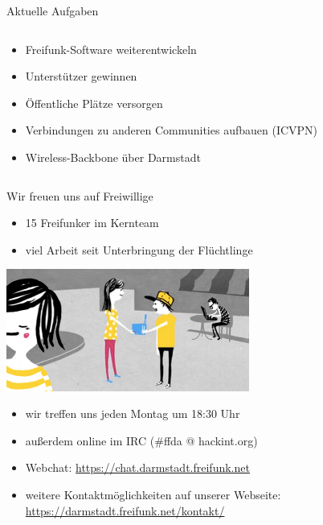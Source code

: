 \documentclass[10pt]{beamer}
\begin{document}
\begin{frame}{Aktuelle Aufgaben}
\begin{columns}[T]
\begin{column}{7cm}
\begin{itemize}
        \end{itemize}
        \begin{itemize}
          \item Freifunk-Software weiterentwickeln
          \item Unterstützer gewinnen
          \item Öffentliche Plätze versorgen
          \item Verbindungen zu anderen Communities aufbauen (ICVPN)
          \item Wireless-Backbone über Darmstadt
        \end{itemize}
        \end{column}
      \end{columns}

    \end{frame}

    \begin{frame}{Wir freuen uns auf Freiwillige}
      \begin{itemize}
        \item 15 Freifunker im Kernteam
        \item viel Arbeit seit Unterbringung der Flüchtlinge
      \end{itemize}
      \vfill
      \hspace{2em}\includegraphics[width=0.6\textwidth]{images/router}
      \vfill
      \begin{itemize}
        \pause
        \item wir treffen uns jeden Montag um 18:30 Uhr
        \item außerdem online im IRC (\#ffda @ hackint.org)
        \item Webchat: \url{https://chat.darmstadt.freifunk.net}
        \item weitere Kontaktmöglichkeiten auf unserer Webseite:\\
        \url{https://darmstadt.freifunk.net/kontakt/}
      \end{itemize}
    \end{frame}
\end{document}
